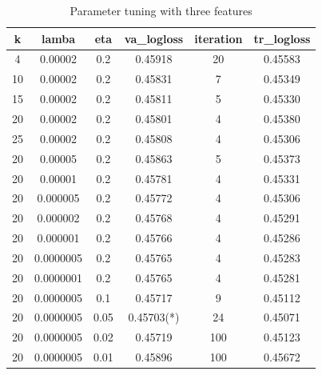 \documentclass[fleqn,10pt]{SelfArx} %
\begin{document}
\begin{table}[!htbp]
\begin{center}
 \begin{tabular}{ c|c|c|c|c|c }\hline\hline
k     &    lamba	  &   eta  & va\_logloss  &  iteration  &  tr\_logloss  \\ \hline\hline
4     &    0.00002   & 0.2    &   0.45918        &    20   &     0.45583 \\
10   &     0.00002  &  0.2    &   0.45831       &       7      &   0.45349 \\
15    &    0.00002   & 0.2    &   0.45811       &        5     &    0.45330\\
20    &    0.00002  &  0.2    &   0.45801       &        4    &     0.45380\\
25    &    0.00002   & 0.2   &    0.45808       &        4   &      0.45306\\
20    &    0.00005  &  0.2    &   0.45863      &        5   &      0.45373   \\   
20    &    0.00001  &  0.2  &     0.45781      &        4   &      0.45331   \\
20     &   0.000005 &  0.2  &     0.45772     &         4   &      0.45306    \\  
20      &  0.000002 &  0.2  &     0.45768     &         4   &      0.45291    \\  
20      &  0.000001 &  0.2  &     0.45766     &         4   &      0.45286      \\
20      &  0.0000005 & 0.2 &      0.45765     &          4  &       0.45283      \\
20     &   0.0000001&  0.2 &      0.45765     &          4  &       0.45281      \\
20    &    0.0000005 & 0.1  &     0.45717     &          9   &      0.45112   \\
20    &    0.0000005 & 0.05  &    0.45703(*) &         24  &       0.45071  \\
20   &     0.0000005 & 0.02   &   0.45719    &        100  &       0.45123    \\  
20    &    0.0000005 & 0.01 &     0.45896     &        100   &      0.45672   \\ \hline\hline
  \end{tabular}
\end{center}
\caption{Parameter tuning with three features}\label{tab:tuning0}
\end{table}
\end{document}
